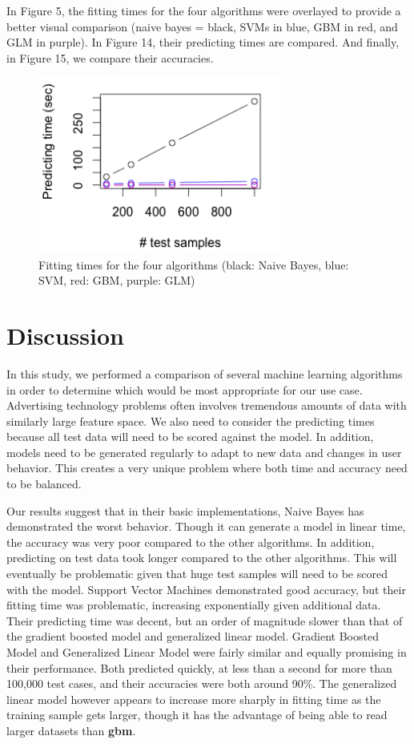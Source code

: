 \documentclass[twoside]{article}
\begin{document}
\begin{multicols}{2}
In Figure 5, the fitting times for the four algorithms were overlayed to provide a better visual comparison (naive bayes = black, SVMs in blue, GBM in red, and GLM in purple). In Figure 14, their predicting times are compared. And finally, in Figure 15, we compare their accuracies.

\begin{figure}[H]
 \caption{Fitting times for the four algorithms (black: Naive Bayes, blue: SVM, red: GBM, purple: GLM)}
  \centering
    \includegraphics[width=8cm]{../data/all_pred}
\end{figure}


\section{Discussion}

In this study, we performed a comparison of several machine learning algorithms in order to determine which would be most appropriate for our use case. Advertising technology problems often involves tremendous amounts of data with similarly large feature space. We also need to consider the predicting times because all test data will need to be scored against the model. In addition, models need to be generated regularly to adapt to new data and changes in user behavior. This creates a very unique problem where both time and accuracy need to be balanced.

Our results suggest that in their basic implementations, Naive Bayes has demonstrated the worst behavior. Though it can generate a model in linear time, the accuracy was very poor compared to the other algorithms. In addition, predicting on test data took longer compared to the other algorithms. This will eventually be problematic given that huge test samples will need to be scored with the model. Support Vector Machines demonstrated good accuracy, but their fitting time was problematic, increasing exponentially given additional data. Their predicting time was decent, but an order of magnitude slower than that of the gradient boosted model and generalized linear model. Gradient Boosted Model and Generalized Linear Model were fairly similar and equally promising in their performance. Both predicted quickly, at less than a second for more than 100,000 test cases, and their accuracies were both around 90\%. The generalized linear model however appears to increase more sharply in fitting time as the training sample gets larger, though it has the advantage of being able to read larger datasets than \textbf{gbm}.


\end{multicols}
\end{document}
